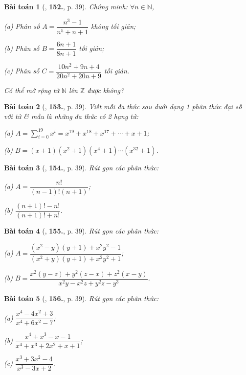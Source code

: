 \documentclass{article}
\numberwithin{equation}{section}
\newtheorem{baitoan}{Bài toán}[section]
\begin{document}
\begin{baitoan}[\cite{Tuyen_Toan_8}, \textbf{152.}, p. 39]
	Chứng minh: $\forall n\in\mathbb{N}$,
	\begin{enumerate*}
		\item[(a)] Phân số $A = \dfrac{n^3 - 1}{n^5 + n + 1}$ không tối giản;
		\item[(b)] Phân số $B = \dfrac{6n + 1}{8n + 1}$ tối giản;
		\item[(c)] Phân số $C = \dfrac{10n^2 + 9n + 4}{20n^2 + 20n + 9}$ tối giản.
	\end{enumerate*}
	Có thể mở rộng từ $\mathbb{N}$ lên $\mathbb{Z}$ được không?
\end{baitoan}

\begin{baitoan}[\cite{Tuyen_Toan_8}, \textbf{153.}, p. 39]
	Viết mỗi đa thức sau dưới dạng 1 phân thức đại số với tử \& mẫu là những đa thức có 2 hạng tử:
	\begin{enumerate*}
		\item[(a)] $A = \sum_{i=0}^{19} x^i = x^{19} + x^{18} + x^{17} + \cdots + x + 1$;
		\item[(b)] $B = (x + 1)(x^2 + 1)(x^4 + 1)\cdots(x^{32} + 1)$.
	\end{enumerate*}
\end{baitoan}

\begin{baitoan}[\cite{Tuyen_Toan_8}, \textbf{154.}, p. 39]
	Rút gọn các phân thức:
	\begin{enumerate*}
		\item[(a)] $A = \dfrac{n!}{(n - 1)!(n + 1)}$;
		\item[(b)] $\dfrac{(n + 1)! - n!}{(n + 1)! + n!}$.
	\end{enumerate*}
\end{baitoan}

\begin{baitoan}[\cite{Tuyen_Toan_8}, \textbf{155.}, p. 39]
	Rút gọn các phân thức:
	
	\begin{enumerate*}
		\item[(a)] $A = \dfrac{(x^2 - y)(y + 1) + x^2y^2 - 1}{(x^2 + y)(y + 1) + x^2y^2 + 1}$;
		\item[(b)] $B = \dfrac{x^2(y - z) + y^2(z - x) + z^2(x - y)}{x^2y - x^2z + y^2z - y^3}$.
	\end{enumerate*}
\end{baitoan}

\begin{baitoan}[\cite{Tuyen_Toan_8}, \textbf{156.}, p. 39]
	Rút gọn các phân thức:
	\begin{enumerate*}
		\item[(a)] $\dfrac{x^4 - 4x^2 + 3}{x^4 + 6x^2 - 7}$;
		\item[(b)] $\dfrac{x^4 + x^3 - x - 1}{x^4 + x^3 + 2x^2 + x + 1}$;
		\item[(c)] $\dfrac{x^3 + 3x^2 - 4}{x^3 - 3x + 2}$.
	\end{enumerate*}
\end{baitoan}
\end{document}
